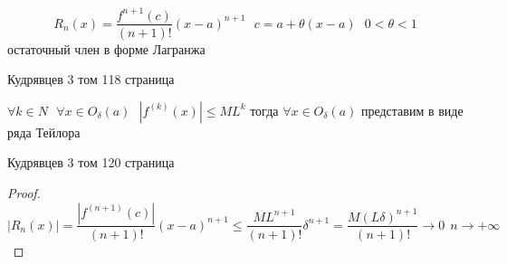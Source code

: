 \begin{define}
  $$
  R_n(x) = \frac{f^{n+1}(c)}{(n+1)!} (x - a)^{n+1} ~~~
  c = a + \theta(x-a) ~~~ 0 < \theta < 1
  $$
  остаточный член в форме Лагранжа

  Кудрявцев 3 том 118 страница
\end{define}

\begin{theorem}
  $\forall k \in N ~~~ \forall x \in O_{\delta}(a) ~~~ |f^{(k)}(x)| \le M L^k$
  тогда $\forall x \in O_{\delta}(a)$ представим в виде ряда Тейлора

  Кудрявцев 3 том 120 страница
\end{theorem}

\begin{proof}
  $$
  |R_n(x)| = \frac{| f^{(n+1)}(c) |}{(n+1)!} (x-a)^{n+1} \le
  \frac{ML^{n+1}}{(n+1)!} \delta^{n+1} =
  \frac{ M (L\delta)^{n+1} }{(n+1)!} \to 0 ~~ n \to +\infty
  $$
\end{proof}